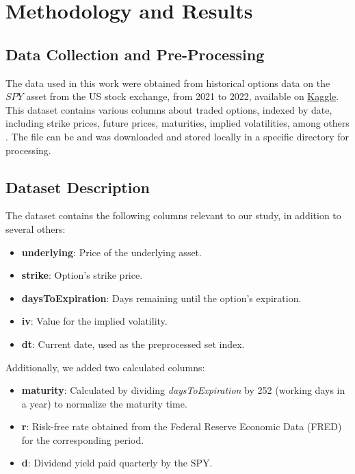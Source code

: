 \section{Methodology and Results}

\subsection{Data Collection and Pre-Processing}

The data used in this work were obtained from historical options data on the $SPY$ asset from the US stock exchange, from 2021 to 2022, available on \href{https://www.kaggle.com/datasets/shawlu/option-spy-dataset-combinedcsv}{Kaggle}. This dataset contains various columns about traded options, indexed by date, including strike prices, future prices, maturities, implied volatilities, among others \citep{}. The file can be and was downloaded and stored locally in a specific directory for processing.

\subsection{Dataset Description}

The dataset contains the following columns relevant to our study, in addition to several others:
\begin{itemize}
	\item \textbf{underlying}: Price of the underlying asset.
	\item \textbf{strike}: Option's strike price.
	\item \textbf{daysToExpiration}: Days remaining until the option's expiration.
	\item \textbf{iv}: Value for the implied volatility.
	\item \textbf{dt}: Current date, used as the preprocessed set index.
\end{itemize}

Additionally, we added two calculated columns:
\begin{itemize}
	\item \textbf{maturity}: Calculated by dividing \textit{daysToExpiration} by 252 (working days in a year) to normalize the maturity time.
	\item \textbf{r}: Risk-free rate obtained from the Federal Reserve Economic Data (FRED) for the corresponding period.
	\item \textbf{d}: Dividend yield paid quarterly by the SPY.
\end{itemize}

